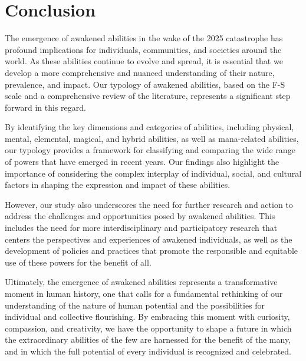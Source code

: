 \documentclass[12pt]{article}
\begin{document}
\section{Conclusion}
The emergence of awakened abilities in the wake of the 2025 catastrophe has profound implications for individuals, communities, and societies around the world. As these abilities continue to evolve and spread, it is essential that we develop a more comprehensive and nuanced understanding of their nature, prevalence, and impact. Our typology of awakened abilities, based on the F-S scale and a comprehensive review of the literature, represents a significant step forward in this regard.

By identifying the key dimensions and categories of abilities, including physical, mental, elemental, magical, and hybrid abilities, as well as mana-related abilities, our typology provides a framework for classifying and comparing the wide range of powers that have emerged in recent years. Our findings also highlight the importance of considering the complex interplay of individual, social, and cultural factors in shaping the expression and impact of these abilities.

However, our study also underscores the need for further research and action to address the challenges and opportunities posed by awakened abilities. This includes the need for more interdisciplinary and participatory research that centers the perspectives and experiences of awakened individuals, as well as the development of policies and practices that promote the responsible and equitable use of these powers for the benefit of all.

Ultimately, the emergence of awakened abilities represents a transformative moment in human history, one that calls for a fundamental rethinking of our understanding of the nature of human potential and the possibilities for individual and collective flourishing. By embracing this moment with curiosity, compassion, and creativity, we have the opportunity to shape a future in which the extraordinary abilities of the few are harnessed for the benefit of the many, and in which the full potential of every individual is recognized and celebrated.



\end{document}
